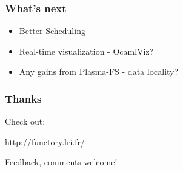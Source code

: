 \documentclass[xcolor=dvipsnames,8pt]{beamer}
\begin{document}

\begin{frame}\frametitle {What's next}
  \begin{itemize}
  \item Better Scheduling
  \item Real-time visualization - OcamlViz?
  \item Any gains from Plasma-FS - data locality?
  \end{itemize}
\end{frame}


\begin{frame}\frametitle {Thanks}


Check out:
\begin{center}
 \textcolor{blue}{\url{http://functory.lri.fr/}}  
\end{center}

Feedback, comments welcome!

\end{frame}

\end{document}
